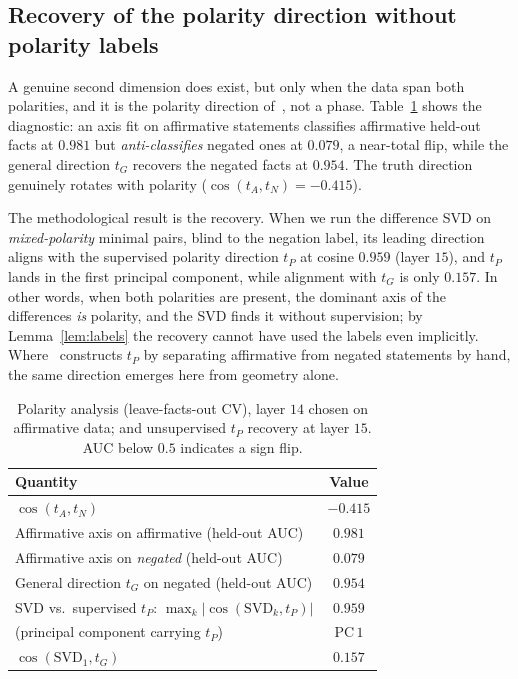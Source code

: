 \documentclass[11pt]{article}
\begin{document}
\subsection{Recovery of the polarity direction without polarity labels}
\label{sec:polarity}

A genuine second dimension does exist, but only when the data span both
polarities, and it is the polarity direction of~\cite{burger2024}, not a
phase. Table~\ref{tab:polarity} shows the diagnostic: an axis fit on
affirmative statements classifies affirmative held-out facts at $0.981$ but
\emph{anti-classifies} negated ones at $0.079$, a near-total flip, while the
general direction $t_G$ recovers the negated facts at $0.954$. The truth
direction genuinely rotates with polarity ($\cos(t_A, t_N) = -0.415$).

The methodological result is the recovery. When we run the difference SVD on
\emph{mixed-polarity} minimal pairs, blind to the negation label, its leading
direction aligns with the supervised polarity direction $t_P$ at cosine
$0.959$ (layer $15$), and $t_P$ lands in the first principal component, while
alignment with $t_G$ is only $0.157$. In other words, when both polarities
are present, the dominant axis of the differences \emph{is} polarity, and the
SVD finds it without supervision; by Lemma~\ref{lem:labels} the recovery
cannot have used the labels even implicitly. Where~\cite{burger2024}
constructs $t_P$ by separating affirmative from negated statements by hand,
the same direction emerges here from geometry alone.

\begin{table}[t]
\centering
\caption{Polarity analysis (leave-facts-out CV), layer $14$ chosen on
affirmative data; and unsupervised $t_P$ recovery at layer $15$. AUC below
$0.5$ indicates a sign flip.}
\label{tab:polarity}
\begin{tabular}{lc}
\toprule
Quantity & Value \\
\midrule
$\cos(t_A, t_N)$ & $-0.415$ \\
Affirmative axis on affirmative (held-out AUC) & $0.981$ \\
Affirmative axis on \emph{negated} (held-out AUC) & $0.079$ \\
General direction $t_G$ on negated (held-out AUC) & $0.954$ \\
\midrule
SVD vs.\ supervised $t_P$: $\max_k |\cos(\mathrm{SVD}_k, t_P)|$ & $0.959$ \\
\quad (principal component carrying $t_P$) & PC\,$1$ \\
$\cos(\mathrm{SVD}_1, t_G)$ & $0.157$ \\
\bottomrule
\end{tabular}
\end{table}
\end{document}
